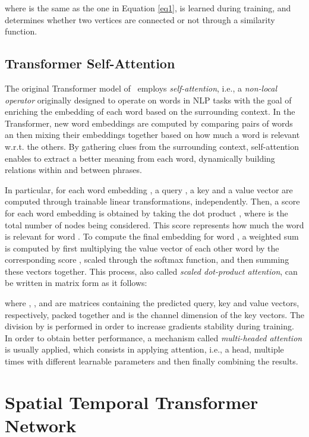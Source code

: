 \documentclass[times,twocolumn,final,authoryear]{elsarticle}
\begin{document}
where  is the same as the one in Equation \ref{eq1},  is learned during training, and  determines whether two vertices are connected or not through a similarity function. 

\subsection{Transformer Self-Attention}
The original Transformer model of~\cite{attention} employs \textit{self-attention}, i.e., a \textit{non-local operator} originally designed to operate on words in NLP tasks with the goal of enriching the embedding of each word based on the surrounding context. In the Transformer, new word embeddings are computed by comparing pairs of words an then mixing their embeddings together based on how much a word is relevant w.r.t. the others. By gathering clues from the surrounding context, self-attention enables to extract a better meaning from each word, dynamically building relations within and between phrases.

In particular, for each word embedding , a query , a key  and a value vector  are computed through trainable linear transformations, independently. Then, a score for each word embedding is obtained by taking the dot product  , where  is the total number of nodes being considered. This score represents how much the word  is relevant for word . To compute the final embedding for word , a weighted sum is computed by first multiplying the value vector of each other word  by the corresponding score , scaled through the softmax function, and then summing these vectors together. This process, also called \textit{scaled dot-product attention}, can be written in matrix form as it follows:

where , , and  are matrices containing the predicted query, key and value vectors, respectively, packed together and  is the channel dimension of the key vectors. The division by  is performed in order to increase gradients stability during training. In order to obtain better performance, a mechanism called \textit{multi-headed attention} is usually applied, which consists in applying attention, i.e., a head, multiple times with different learnable parameters and then finally combining the results.





\section{Spatial Temporal Transformer Network}
\end{document}
